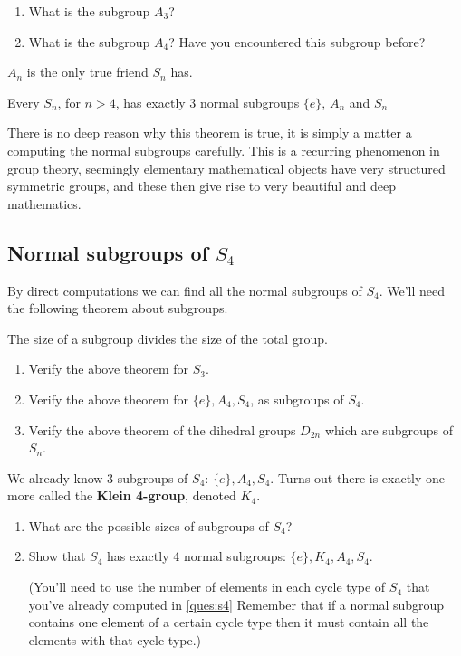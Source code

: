 \begin{questions}[resume]
  \item 
  \begin{enumerate}[resume]
      \item What is the subgroup $ A_3$?
      \item What is the subgroup $ A_4$? Have you encountered this subgroup before?
  \end{enumerate}
\end{questions}

$ A_n$ is the only true friend $ S_n$ has.
\begin{thm}
  Every $ S_n$, for $ n>4$, has exactly 3 normal subgroups $ \{e \}$, $ A_n$ and $ S_n$
\end{thm}
There is no deep reason why this theorem is true, it is simply a matter a computing the normal subgroups carefully. This is a recurring phenomenon in group theory, seemingly elementary mathematical objects have very structured symmetric groups, and these then give rise to very beautiful and deep mathematics.




\newpage
\subsection{Normal subgroups of $ S_4$}
By direct computations we can find all the normal subgroups of $ S_4$. We'll need the following theorem about subgroups.
\begin{thm}
  The size of a subgroup divides the size of the total group.
\end{thm}

\begin{questions}[resume]
  \item \begin{enumerate}
    \item Verify the above theorem for $ S_3$.
    \item Verify the above theorem for $ \{ e \}, A_4, S_4$, as subgroups of $ S_4$. 
    \item Verify the above theorem of the dihedral groups $ D_{2n}$ which are subgroups of $ S_n$.
  \end{enumerate}
\end{questions}

We already know 3 subgroups of $ S_4$: $ \{ e \}, A_4, S_4$. Turns out there is exactly one more called the \textbf{Klein 4-group}, denoted $ K_4$.
\begin{questions}[resume]
  \item \begin{enumerate}
    \item What are the possible sizes of subgroups of $ S_4$?
    \item Show that $ S_4$ has exactly 4 normal subgroups: $ \{ e \}, K_4, A_4, S_4$.
    
     (You'll need to use the number of elements in each cycle type of $ S_4$ that you've already computed in \ref{ques:s4} Remember that if a normal subgroup contains one element of a certain cycle type then it must contain all the elements with that cycle type.)
  \end{enumerate}
\end{questions}

